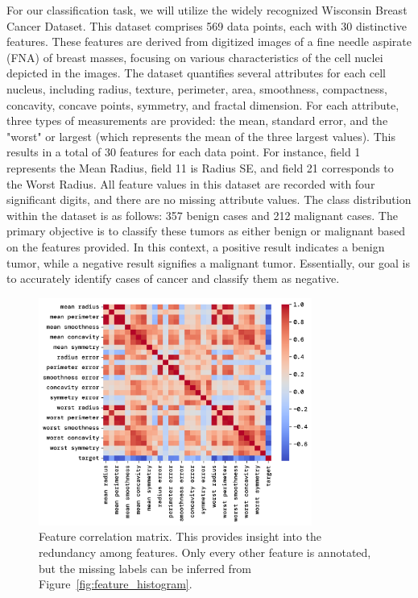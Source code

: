 \documentclass[twoside,11pt]{report}
\begin{document}
    For our classification task, we will utilize the widely recognized Wisconsin Breast Cancer 
    Dataset\cite{misc_breast_cancer17}. This dataset comprises 569 data points, 
    each with 30 distinctive features. 
    These features are derived from digitized images of a fine needle aspirate (FNA) of breast masses, focusing on 
    various characteristics of the cell nuclei depicted in the images.
    The dataset quantifies several attributes for each cell nucleus, including radius, texture, perimeter, area, 
    smoothness, compactness, concavity, concave points, symmetry, and fractal dimension. For each attribute, three 
    types of measurements are provided: the mean, standard error, and the "worst" or largest (which represents the 
    mean of the three largest values). This results in a total of 30 features for each data point. For instance, 
    field 1 represents the Mean Radius, field 11 is Radius SE, and field 21 corresponds to the Worst Radius.
    All feature values in this dataset are recorded with four significant digits, and there are no missing attribute 
    values. The class distribution within the dataset is as follows: 357 benign cases and 212 malignant cases.
    The primary objective is to classify these tumors as either benign or malignant based on the features provided. 
    In this context, a positive result indicates a benign tumor, while a negative result signifies a malignant tumor. 
    Essentially, our goal is to accurately identify cases of cancer and classify them as negative.


    \begin{figure}[h]
        \begin{center}
            \includegraphics[width=0.8\textwidth]{../runsAndFigures/feature_correlation.png}
        \end{center}
        \caption{Feature correlation matrix. This provides insight into the redundancy among features. 
        Only every other feature is annotated, but the missing labels can be inferred from 
            Figure~\ref{fig:feature_histogram}.}\label{fig:feature_correlation}
    \end{figure}
\end{document}
